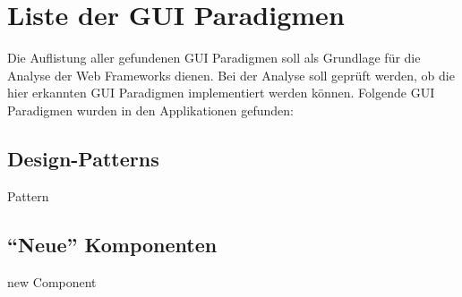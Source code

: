   \section{Liste der GUI Paradigmen}
  
  Die Auflistung aller gefundenen GUI Paradigmen soll als Grundlage für die
  Analyse der Web Frameworks dienen. Bei der Analyse soll geprüft werden, ob
  die hier erkannten GUI Paradigmen implementiert werden können. Folgende GUI
  Paradigmen wurden in den Applikationen gefunden:
      
  \subsection{Design-Patterns}
  
  \begin{description}
    \item[Pattern]
  \end{description}
  
  \subsection{``Neue'' Komponenten}
  
  \begin{description}
    \item[new Component]
  \end{description}
